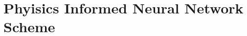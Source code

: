 \documentclass{myproject}
\begin{document}

\section{Phyisics Informed Neural Network Scheme}
\end{document}
